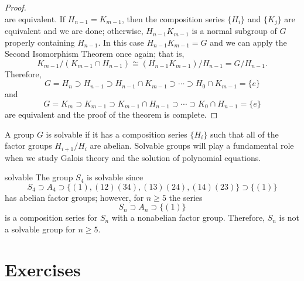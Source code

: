 \begin{proof}
\[\]
are equivalent. If $H_{n-1} = K_{m-1}$, then the composition series
$\{H_i \}$ and $\{ K_j \}$ are equivalent and we are done; otherwise,
$H_{n-1} K_{m-1}$  is a normal subgroup of $G$ properly containing
$H_{n-1}$.  In this case $H_{n-1} K_{m-1} = G$ and we can apply the
Second Isomorphism Theorem once again; that is,
\[
K_{m-1} / (K_{m-1} \cap H_{n-1}) \cong (H_{n-1} K_{m-1}) / H_{n-1} =
G/H_{n-1}.
\]
Therefore,
\[
G = H_n \supset H_{n-1} \supset H_{n-1} \cap K_{m-1} \supset 
\cdots \supset H_0 \cap K_{m-1} = \{ e \}
\]
and 
\[
G = K_m \supset K_{m-1} \supset K_{m-1} \cap H_{n-1} \supset 
\cdots \supset K_0 \cap H_{n-1} = \{ e \}
\]
are equivalent and the proof of the theorem is complete.
\end{proof}
 
 
\medskip
 
 
A group $G$ is {\bfi solvable\/} if it has 
a composition series $\{ H_i \}$ such that all of the factor groups 
$H_{i+1} / H_i$ are abelian. Solvable groups will play a fundamental 
role when we study Galois theory and the solution of polynomial 
equations. 
 
 
 
\begin{example}{solvable}
The group $S_4$ is solvable since
\[
S_4 \supset A_4 \supset \{ (1), (12)(34), (13)(24), (14)(23) \} 
\supset \{ (1) \}
\]
has abelian factor groups; however, for $n \geq 5$ the series
\[
S_n \supset A_n \supset \{ (1) \}
\]
is a composition series for $S_n$ with a nonabelian factor group.
Therefore, $S_n$ is not a solvable group for $n \geq 5$. 
\end{example}
 
 
 
 
\section*{Exercises}
\exrule
 
 
 
